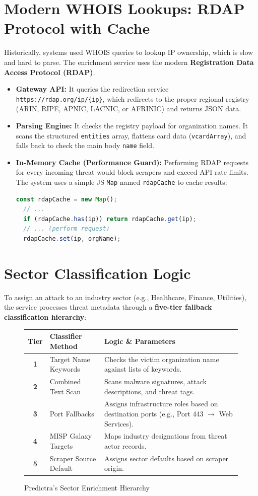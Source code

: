 \documentclass[11pt,a4paper]{report}
\begin{document}
\section{Modern WHOIS Lookups: RDAP Protocol with Cache}
Historically, systems used WHOIS queries to lookup IP ownership, which is slow and hard to parse. The enrichment service uses the modern \textbf{Registration Data Access Protocol (RDAP)}.
\begin{itemize}
  \item \textbf{Gateway API:} It queries the redirection service \texttt{https://rdap.org/ip/\{ip\}}, which redirects to the proper regional registry (ARIN, RIPE, APNIC, LACNIC, or AFRINIC) and returns JSON data.
  \item \textbf{Parsing Engine:} It checks the registry payload for organization names. It scans the structured \texttt{entities} array, flattens card data (\texttt{vcardArray}), and falls back to check the main body \texttt{name} field.
  \item \textbf{In-Memory Cache (Performance Guard):} Performing RDAP requests for every incoming threat would block scrapers and exceed API rate limits. The system uses a simple JS \texttt{Map} named \texttt{rdapCache} to cache results:
  \begin{lstlisting}[language=JavaScript]
  const rdapCache = new Map();
  // ...
  if (rdapCache.has(ip)) return rdapCache.get(ip);
  // ... (perform request)
  rdapCache.set(ip, orgName);
  \end{lstlisting}
\end{itemize}

\section{Sector Classification Logic}
To assign an attack to an industry sector (e.g., Healthcare, Finance, Utilities), the service processes threat metadata through a \textbf{five-tier fallback classification hierarchy}:

\begin{figure}[H]
  \centering
  \small
  \begin{tabular}{|c|p{4cm}|p{7.5cm}|}
    \hline
    \textbf{Tier} & \textbf{Classifier Method} & \textbf{Logic \& Parameters} \\ \hline
    \textbf{1} & Target Name Keywords & Checks the victim organization name against lists of keywords. \\ \hline
    \textbf{2} & Combined Text Scan & Scans malware signatures, attack descriptions, and threat tags. \\ \hline
    \textbf{3} & Port Fallbacks & Assigns infrastructure roles based on destination ports (e.g., Port 443 $\rightarrow$ Web Services). \\ \hline
    \textbf{4} & MISP Galaxy Targets & Maps industry designations from threat actor records. \\ \hline
    \textbf{5} & Scraper Source Default & Assigns sector defaults based on scraper origin. \\ \hline
  \end{tabular}
  \caption{Predictra's Sector Enrichment Hierarchy}
\end{figure}
\end{document}
